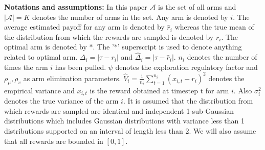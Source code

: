 \textbf{Notations and assumptions:} In this paper $\mathcal{A}$ is the set of all arms and $|\mathcal{A}|=K$ denotes the number of arms in the set. Any arm is denoted by $i$. The average estimated payoff for any arm is denoted by $\hat{r}_{i}$ whereas the true mean of the distribution from which the rewards are sampled is denoted by $r_{i}$. The optimal arm is denoted by $*$. The '*' superscript is used to denote anything related to optimal arm.  $\Delta_{i}=|\tau-r_{i}|$ and $\hat{\Delta}_{i}=|\tau-\hat{r}_{i}|$.  $n_{i}$ denotes the number of times the arm $i$ has been pulled. $\psi $ denotes the exploration regulatory factor and $\rho_\mu ,\rho_v$ as arm elimination parameters. $\hat{V}_{i}=\frac{1}{n_i}\sum_{t=1}^{n_{i}}(x_{i,t}-r_{i})^{2}$ denotes the empirical variance and $x_{i,t}$ is the reward obtained at timestep t for arm $i$. Also  $\sigma_{i}^{2}$ denotes the true variance of the arm $i$. It is assumed that the distribution from which rewards are sampled are identical and independent 1-sub-Gaussian distributions which includes Gaussian distributions with variance less than 1 distributions supported on an interval of length less than 2. We will also assume that all rewards are bounded in $[0,1]$.

